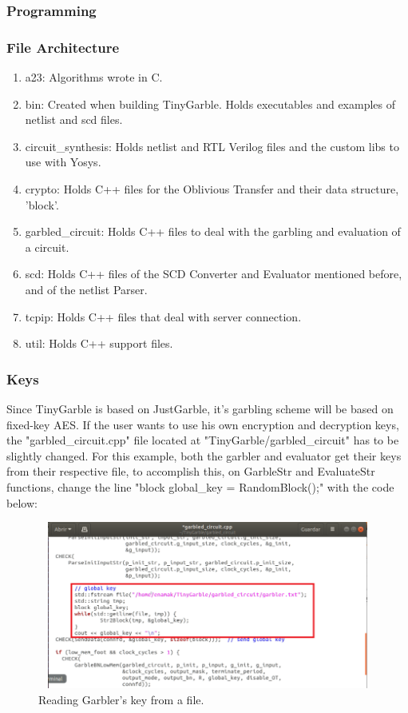 \begin{refsection}
\newpage

\subsubsection{Programming}

\subsubsection{File Architecture}

\begin{enumerate}
\item a23: Algorithms wrote in C.
\item bin: Created when building TinyGarble. Holds executables and examples of netlist and scd files.
\item circuit\_synthesis: Holds netlist and RTL Verilog files and the custom libs to use with Yosys.
\item crypto: Holds C++ files for the Oblivious Transfer and their data structure, 'block'.
\item garbled\_circuit: Holds C++ files to deal with the garbling and evaluation of a circuit.
\item scd:  Holds C++ files of the SCD Converter and Evaluator mentioned before, and of the netlist Parser.
\item tcpip: Holds C++ files that deal with server connection.
\item util: Holds C++ support files.
\end{enumerate}

\subsubsection{Keys}

Since TinyGarble is based on JustGarble, it's garbling scheme will be based on fixed-key AES. If the user wants to use his own encryption and decryption keys, the "garbled\_circuit.cpp" file located at "TinyGarble/garbled\_circuit" has to be slightly changed. For this example, both the garbler and evaluator get their keys from their respective file, to accomplish this, on GarbleStr and EvaluateStr functions, change the line "block global\_key =  RandomBlock();" with the code below:

\begin{figure}[H]
	\centering
	\includegraphics[width=1\textwidth, height=5.5cm]{./sdf/secure_multiparty_computation/figures/key_file.png}
    \caption{Reading Garbler's key from a file.}\label{fig:key_file}
\end{figure}


\end{refsection}
